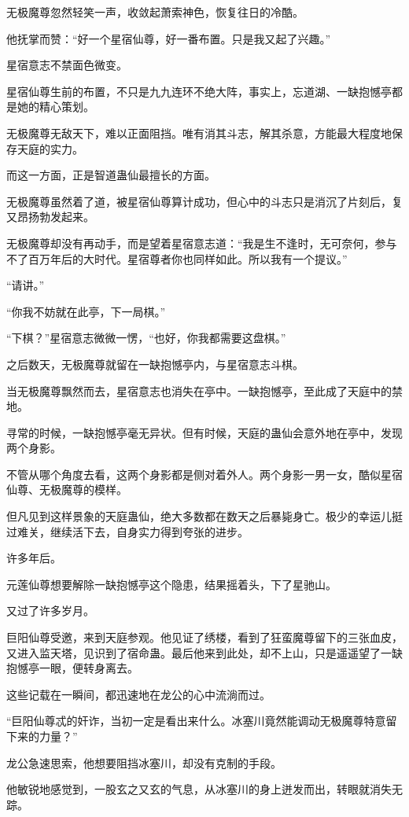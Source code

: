 \begin{this_body}
无极魔尊忽然轻笑一声，收敛起萧索神色，恢复往日的冷酷。

他抚掌而赞：“好一个星宿仙尊，好一番布置。只是我又起了兴趣。”

星宿意志不禁面色微变。

星宿仙尊生前的布置，不只是九九连环不绝大阵，事实上，忘道湖、一缺抱憾亭都是她的精心策划。

无极魔尊无敌天下，难以正面阻挡。唯有消其斗志，解其杀意，方能最大程度地保存天庭的实力。

而这一方面，正是智道蛊仙最擅长的方面。

无极魔尊虽然着了道，被星宿仙尊算计成功，但心中的斗志只是消沉了片刻后，复又昂扬勃发起来。

无极魔尊却没有再动手，而是望着星宿意志道：“我是生不逢时，无可奈何，参与不了百万年后的大时代。星宿尊者你也同样如此。所以我有一个提议。”

“请讲。”

“你我不妨就在此亭，下一局棋。”

“下棋？”星宿意志微微一愣，“也好，你我都需要这盘棋。”

之后数天，无极魔尊就留在一缺抱憾亭内，与星宿意志斗棋。

当无极魔尊飘然而去，星宿意志也消失在亭中。一缺抱憾亭，至此成了天庭中的禁地。

寻常的时候，一缺抱憾亭毫无异状。但有时候，天庭的蛊仙会意外地在亭中，发现两个身影。

不管从哪个角度去看，这两个身影都是侧对着外人。两个身影一男一女，酷似星宿仙尊、无极魔尊的模样。

但凡见到这样景象的天庭蛊仙，绝大多数都在数天之后暴毙身亡。极少的幸运儿挺过难关，继续活下去，自身实力得到夸张的进步。

许多年后。

元莲仙尊想要解除一缺抱憾亭这个隐患，结果摇着头，下了星驰山。

又过了许多岁月。

巨阳仙尊受邀，来到天庭参观。他见证了绣楼，看到了狂蛮魔尊留下的三张血皮，又进入监天塔，见识到了宿命蛊。最后他来到此处，却不上山，只是遥遥望了一缺抱憾亭一眼，便转身离去。

这些记载在一瞬间，都迅速地在龙公的心中流淌而过。

“巨阳仙尊忒的奸诈，当初一定是看出来什么。冰塞川竟然能调动无极魔尊特意留下来的力量？”

龙公急速思索，他想要阻挡冰塞川，却没有克制的手段。

他敏锐地感觉到，一股玄之又玄的气息，从冰塞川的身上迸发而出，转眼就消失无踪。


\end{this_body}
